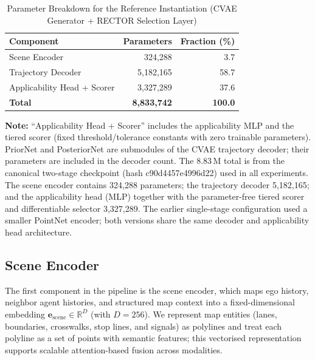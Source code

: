 \begin{table}[h]
\centering
\small
\caption{Parameter Breakdown for the Reference Instantiation (CVAE Generator + RECTOR Selection Layer)}
\label{tab:param_breakdown}
\begin{tabular}{lrr}
\toprule
\textbf{Component} & \textbf{Parameters} & \textbf{Fraction (\%)} \\
\midrule
Scene Encoder & 324,288 & 3.7 \\
Trajectory Decoder & 5,182,165 & 58.7 \\
Applicability Head + Scorer & 3,327,289 & 37.6 \\
\midrule
\textbf{Total} & \textbf{8,833,742} & \textbf{100.0} \\
\bottomrule
\end{tabular}
\end{table}

\noindent\small\textbf{Note:} ``Applicability Head + Scorer'' includes the applicability MLP and the tiered scorer (fixed threshold/tolerance constants with zero trainable parameters).  PriorNet and PosteriorNet are submodules of the CVAE trajectory decoder; their parameters are included in the decoder count.  The 8.83\,M total is from the canonical two-stage checkpoint (hash c90d4457e4996d22) used in all experiments.  The scene encoder contains 324{,}288 parameters; the trajectory decoder 5{,}182{,}165; and the applicability head (MLP) together with the parameter-free tiered scorer and differentiable selector 3{,}327{,}289.  The earlier single-stage configuration used a smaller PointNet encoder; both versions share the same decoder and applicability head architecture.


\subsection{Scene Encoder}
\label{subsec:scene_encoder}

The first component in the pipeline is the scene encoder, which maps ego history, neighbor agent histories, and structured map context into a fixed-dimensional embedding $\mathbf{e}_{\text{scene}}\in\mathbb{R}^{D}$ (with $D{=}256$).  We represent map entities (lanes, boundaries, crosswalks, stop lines, and signals) as polylines and treat each polyline as a set of points with semantic features; this vectorised representation supports scalable attention-based fusion across modalities.


